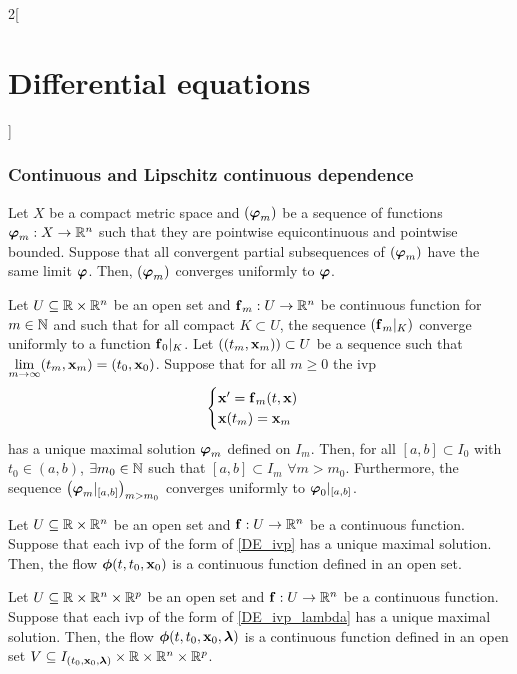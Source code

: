 \documentclass[../../../main.tex]{subfiles}
\begin{document}
\begin{multicols}{2}[\section{Differential equations}]
  \subsubsection{Continuous and Lipschitz continuous dependence}
  \begin{lemma}
    Let $X$ be a compact metric space and $(\boldsymbol{\mathrm{\varphi}}_m)$ be a sequence of functions $\boldsymbol{\mathrm{\varphi}}_m:X\rightarrow\mathbb{R}^n$ such that they are pointwise equicontinuous and pointwise bounded. Suppose that all convergent partial subsequences of $(\boldsymbol{\mathrm{\varphi}}_m)$ have the same limit $\boldsymbol{\mathrm{\varphi}}$. Then, $(\boldsymbol{\mathrm{\varphi}}_m)$ converges uniformly to $\boldsymbol{\mathrm{\varphi}}$.
  \end{lemma}
  \begin{proposition}
    Let $U\subseteq\mathbb{R}\times\mathbb{R}^n$ be an open set and $\boldsymbol{\mathrm{f}}_m:U\rightarrow\mathbb{R}^n$ be continuous function for $m\in\mathbb{N}$ and such that for all compact $K\subset U$, the sequence $(\boldsymbol{\mathrm{f}}_m|_K)$ converge uniformly to a function $\boldsymbol{\mathrm{f}}_0|_K$. Let $((t_m,\boldsymbol{\mathrm{x}}_m))\subset U$ be a sequence such that $\displaystyle\lim_{m\to\infty}(t_m,\boldsymbol{\mathrm{x}}_m)=(t_0,\boldsymbol{\mathrm{x}}_0)$. Suppose that for all $m\geq 0$ the ivp
    \begin{equation*}
      \begin{cases}
        \boldsymbol{\mathrm{x}}'      =\boldsymbol{\mathrm{f}}_m(t,\boldsymbol{\mathrm{x}}) \\
        \boldsymbol{\mathrm{x}}(t_m)  =\boldsymbol{\mathrm{x}}_m
      \end{cases}
    \end{equation*}
    has a unique maximal solution $\boldsymbol{\mathrm{\varphi}}_m$ defined on $I_m$. Then, for all $[a,b]\subset I_0$ with $t_0\in(a,b)$, $\exists m_0\in\mathbb{N}$ such that $[a,b]\subset I_m$ $\forall m>m_0$. Furthermore, the sequence $\left(\boldsymbol{\mathrm{\varphi}}_m|_{[a,b]}\right)_{m>m_0}$ converges uniformly to $\boldsymbol{\mathrm{\varphi}}_0|_{[a,b]}$.
  \end{proposition}
  \begin{theorem}
    Let $U\subseteq\mathbb{R}\times\mathbb{R}^n$ be an open set and $\boldsymbol{\mathrm{f}}:U\rightarrow\mathbb{R}^n$ be a continuous function. Suppose that each ivp of the form of \cref{DE_ivp} has a unique maximal solution. Then, the flow $\boldsymbol{\mathrm{\phi}}(t,t_0,\boldsymbol{\mathrm{x}}_0)$ is a continuous function defined in an open set.
  \end{theorem}
  \begin{theorem}
    Let $U\subseteq\mathbb{R}\times\mathbb{R}^n\times\mathbb{R}^p$ be an open set and $\boldsymbol{\mathrm{f}}:U\rightarrow\mathbb{R}^n$ be a continuous function. Suppose that each ivp of the form of \cref{DE_ivp_lambda} has a unique maximal solution. Then, the flow $\boldsymbol{\mathrm{\phi}}(t,t_0,\boldsymbol{\mathrm{x}}_0,\boldsymbol{\mathrm{\lambda}})$ is a continuous function defined in an open set $V\subseteq I_{(t_0,\boldsymbol{\mathrm{x}}_0,\boldsymbol{\mathrm{\lambda}})}\times\mathbb{R}\times\mathbb{R}^n\times\mathbb{R}^p$.

\end{theorem}
\end{multicols}
\end{document}
